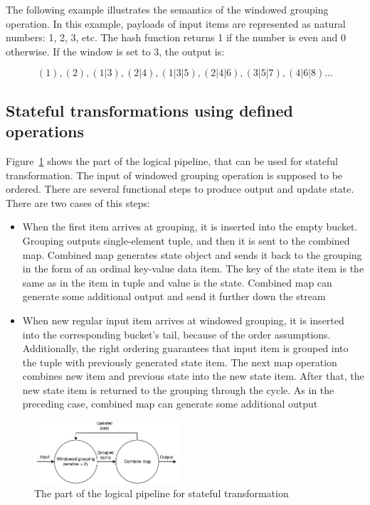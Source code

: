 The following example illustrates the semantics of the windowed grouping operation. In this example, payloads of input items are represented as natural numbers: 1, 2, 3, etc. The hash function returns 1 if the number is even and 0 otherwise. If the window is set to 3, the output is:

\[(1), (2), (1|3), (2|4), (1|3|5), (2|4|6), (3|5|7), (4|6|8)...\]

\subsection{Stateful transformations using defined operations}
Figure~\ref{stateful-schema} shows the part of the logical pipeline, that can be used for stateful transformation. The input of windowed grouping operation is supposed to be ordered. There are several functional steps to produce output and update state. There are two cases of this steps:


\begin{itemize}
    \item When the first item arrives at grouping, it is inserted into the empty bucket. Grouping outputs single-element tuple, and then it is sent to the combined map. Combined map generates state object and sends it back to the grouping in the form of an ordinal key-value data item. The key of the state item is the same as in the item in tuple and value is the state. Combined map can generate some additional output and send it further down the stream
    \item When new regular input item arrives at windowed grouping, it is inserted into the corresponding bucket's tail, because of the order assumptions. Additionally, the right ordering guarantees that input item is grouped into the tuple with previously generated state item. The next map operation combines new item and previous state into the new state item. After that, the new state item is returned to the grouping through the cycle. As in the preceding case, combined map can generate some additional output
\end{itemize}


\begin{figure}[htbp]
  \centering
  \includegraphics[width=0.48\textwidth]{pics/stateful-schema}
  \caption{The part of the logical pipeline for stateful transformation}
  \label {stateful-schema}
\end{figure}


